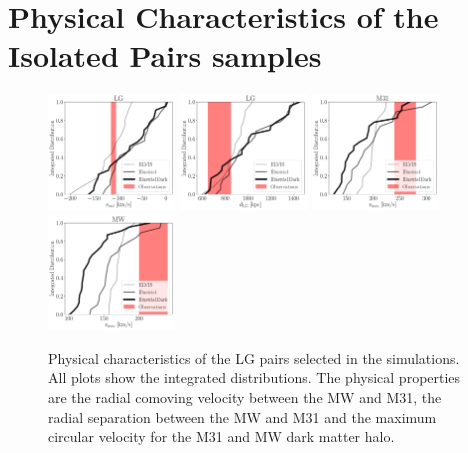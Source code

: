 \documentclass[a4paper,fleqn,usenatbib]{mnras}
\begin{document}
\appendix


\section{Physical Characteristics of the Isolated Pairs samples}
\label{appendix:physical}

\begin{figure}
\centering
\includegraphics[width=0.30\textwidth]{int_distro_LG_v_rad.pdf}
\includegraphics[width=0.30\textwidth]{int_distro_LG_d.pdf}
\includegraphics[width=0.30\textwidth]{int_distro_M31_vmax.pdf}
\includegraphics[width=0.30\textwidth]{int_distro_MW_vmax.pdf}
\caption{Physical characteristics of the LG pairs selected in the
  simulations. All plots show the integrated distributions. The
  physical properties are the radial comoving velocity between the MW
  and M31, the radial separation between the MW and M31 and the
  maximum circular velocity for the M31 and MW dark matter halo.
\label{fig:physical_pairs}}
\end{figure}
\end{document}
